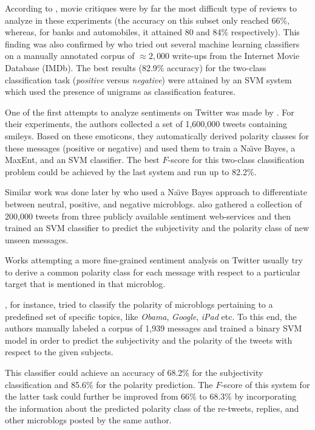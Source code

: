 According to \citet{Turney:02}, movie critiques were by far the most
difficult type of reviews to analyze in these experiments (the
accuracy on this subset only reached 66\%, whereas, for banks and
automobiles, it attained 80 and 84\% respectively).  This finding was
also confirmed by \citet{Pang:02} who tried out several machine
learning classifiers on a manually annotated corpus of $\approx2,000$
write-ups from the Internet Movie Database (IMDb).  The best results
(82.9\% accuracy) for the two-class classification task
(\emph{positive} versus \emph{negative}) were attained by an SVM
system which used the presence of unigrams as classification features.

One of the first attempts to analyze sentiments on Twitter was made by
\citet{Go:09}.  For their experiments, the authors collected a set of
1,600,000 tweets containing smileys.  Based on these emoticons, they
automatically derived polarity classes for these messages (positive or
negative) and used them to train a Na\"{\i}ve Bayes, a MaxEnt, and an
SVM classifier.  The best $F$-score for this two-class classification
problem could be achieved by the last system and run up to 82.2\%.

Similar work was done later by \citet{Pak:10} who used a Na\"{\i}ve
Bayes approach to differentiate between neutral, positive, and
negative microblogs. \citet{Barbosa:10} also gathered a collection of
200,000 tweets from three publicly available sentiment web-services
and then trained an SVM classifier to predict the subjectivity and the
polarity class of new unseen messages.

Works attempting a more fine-grained sentiment analysis on Twitter
usually try to derive a common polarity class for each message with
respect to a particular target that is mentioned in that microblog.

\citet{Jiang:11}, for instance, tried to classify the polarity of
microblogs pertaining to a predefined set of specific topics, like
\emph{Obama}, \emph{Google}, \emph{iPad} etc.  To this end, the
authors manually labeled a corpus of 1,939 messages and trained a
binary SVM model in order to predict the subjectivity and the polarity
of the tweets with respect to the given subjects.

This classifier could achieve an accuracy of 68.2\% for the
subjectivity classification and 85.6\% for the polarity prediction.
The $F$-score of this system for the latter task could further be
improved from 66\% to 68.3\% by incorporating the information about
the predicted polarity class of the re-tweets, replies, and other
microblogs posted by the same author.

